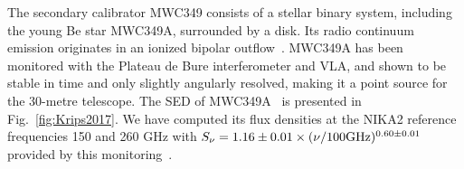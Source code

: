 


%

\label{se:fluxSec}

The secondary calibrator MWC349 consists of a stellar
binary system, including the young Be star MWC349A, surrounded by a
disk. Its radio continuum emission
originates in an ionized bipolar outflow~\cite{Tafoya}.  MWC349A has
been monitored with the Plateau de Bure interferometer and VLA, and
shown to be stable in time and only slightly angularly resolved,
making it a point source for the 30-metre telescope. The SED of
MWC349A~\cite{krips} is presented in Fig.~\ref{fig:Krips2017}. We have
computed its flux densities at the NIKA2 reference frequencies 150 and
260 GHz with $S_\nu = 1.16\pm0.01 \times
(\nu/100 \rm{GHz})^{0.60\pm0.01}$ provided by this
monitoring~\cite{krips}.

